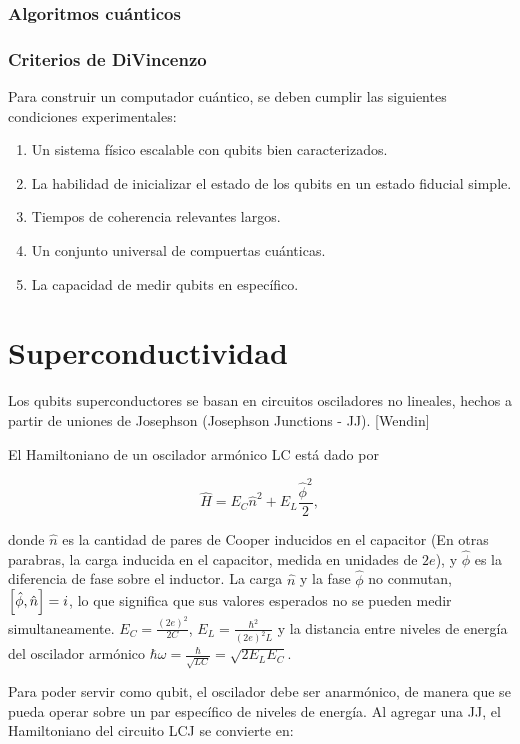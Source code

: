\documentclass[11pt, spanish]{report}
\begin{document}
\subsection{Algoritmos cuánticos}

\subsection{Criterios de DiVincenzo}
Para construir un computador cuántico, se deben cumplir las siguientes condiciones experimentales:

\begin{enumerate}
\item Un sistema físico escalable con qubits bien caracterizados.
\item La habilidad de inicializar el estado de los qubits en un estado fiducial simple.
\item Tiempos de coherencia relevantes largos.
\item Un conjunto universal de compuertas cuánticas.
\item La capacidad de medir qubits en específico.
\end{enumerate}

\chapter{Superconductividad}
Los qubits superconductores se basan en circuitos osciladores no lineales, hechos a partir de uniones de Josephson (Josephson Junctions - JJ). [Wendin]
\vspace{0.5cm}

El Hamiltoniano de un oscilador armónico LC está dado por 

\[
\hat{H} = E_C \hat{n}^2 + E_L \frac{\hat{\phi}^2}{2},
\]

donde $\hat{n}$ es la cantidad de pares de Cooper inducidos en el capacitor (En otras parabras, la carga inducida en el capacitor, medida en unidades de $2e$), y $\hat{\phi}$ es la diferencia de fase sobre el inductor. La carga $\hat{n}$ y la fase $\hat{\phi}$ no conmutan, $\comm{\hat{\phi}}{\hat{n}}=i$, lo que significa que sus valores esperados no se pueden medir simultaneamente. $E_C=\frac{(2e)^2}{2C}$, $E_L=\frac{\hbar^2}{(2e)^2L}$ y la distancia entre niveles de energía del oscilador armónico $\hbar \omega = \frac{\hbar}{\sqrt{LC}}=\sqrt{2E_LE_C}$.
\vspace{0.5cm}

Para poder servir como qubit, el oscilador debe ser anarmónico, de manera que se pueda operar sobre un par específico de niveles de energía. Al agregar una JJ, el Hamiltoniano del circuito LCJ se convierte en:
\end{document}

